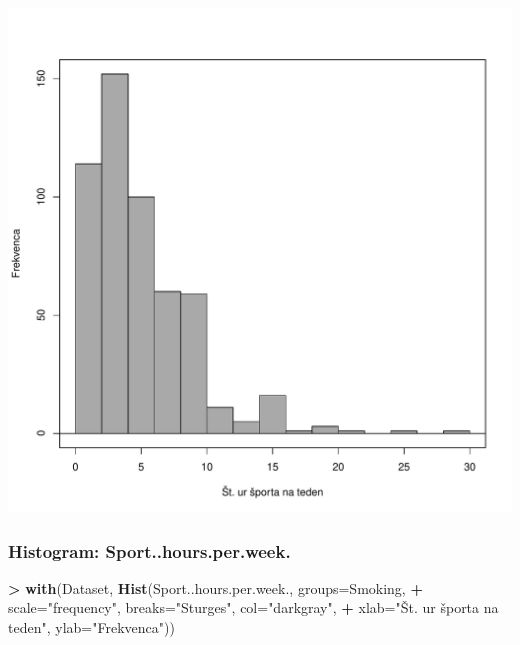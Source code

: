 \documentclass[
]{article}
\newenvironment{Shaded}{\begin{snugshade}}{\end{snugshade}}
\newcommand{\AttributeTok}[1]{\textcolor[rgb]{0.13,0.29,0.53}{#1}}
\newcommand{\FunctionTok}[1]{\textcolor[rgb]{0.13,0.29,0.53}{\textbf{#1}}}
\newcommand{\NormalTok}[1]{#1}
\newcommand{\SpecialCharTok}[1]{\textcolor[rgb]{0.81,0.36,0.00}{\textbf{#1}}}
\newcommand{\StringTok}[1]{\textcolor[rgb]{0.31,0.60,0.02}{#1}}
\begin{document}
\includegraphics[width=750px]{RcmdrMarkdown_files/figure-latex/unnamed-chunk-11-1}

\subsubsection{Histogram:
Sport..hours.per.week.}\label{histogram-sport..hours.per.week.-3}

\begin{Shaded}
\begin{Highlighting}[]
\SpecialCharTok{\textgreater{}} \FunctionTok{with}\NormalTok{(Dataset, }\FunctionTok{Hist}\NormalTok{(Sport..hours.per.week., }\AttributeTok{groups=}\NormalTok{Smoking, }
\SpecialCharTok{+}   \AttributeTok{scale=}\StringTok{"frequency"}\NormalTok{, }\AttributeTok{breaks=}\StringTok{"Sturges"}\NormalTok{, }\AttributeTok{col=}\StringTok{"darkgray"}\NormalTok{, }
\SpecialCharTok{+}   \AttributeTok{xlab=}\StringTok{"Št. ur športa na teden"}\NormalTok{, }\AttributeTok{ylab=}\StringTok{"Frekvenca"}\NormalTok{))}
\end{Highlighting}
\end{Shaded}
\end{document}
